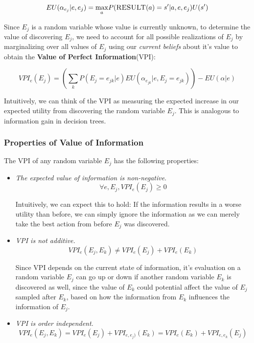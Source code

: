 \documentclass[11pt]{article}
\begin{document}
$$
EU(\alpha_{e_j} | e, e_j) = \underset{a}{\max} P(\textsc{RESULT}(a)=s'|a, e, e_j) U(s')
$$

Since $E_j$ is a random variable whose value is currently unknown, to determine the value of discovering $E_j$, we need to account for all possible realizations of $E_j$ by marginalizing over all values of $E_j$ using our \textit{current beliefs} about it's value to obtain the \textbf{Value of Perfect Information}(VPI):

$$
VPI_e(E_j) = \left( \sum_k P(E_j = e_{jk} | e) EU(\alpha_{e_{jk}} | e, E_j = e_{jk}) \right) - EU(\alpha | e)
$$

Intuitively, we can think of the VPI as measuring the expected increase in our expected utility from discovering the random variable $E_j$. This is analogous to information gain in decision trees.

\subsubsection{Properties of Value of Information}

The VPI of any random variable $E_j$ has the following properties:

\begin{itemize}
    \item \textit{The expected value of information is non-negative}.
    $$
    \forall e, E_j, VPI_e(E_j) \geq 0
    $$
    
    Intuitively, we can expect this to hold: If the information results in a worse utility than before, we can simply ignore the information as we can merely take the best action from before $E_j$ was discovered.
    
    \item \textit{VPI is not additive.}
    $$
    VPI_e(E_j, E_k) \neq VPI_e(E_j) + VPI_e(E_k)
    $$
    
    Since VPI depends on the current state of information, it's evaluation on a random variable $E_j$ can go up or down if another random variable $E_k$ is discovered as well, since the value of $E_k$ could potential affect the value of $E_j$ sampled after $E_k$, based on how the information from $E_k$ influences the information of $E_j$.
    
    \item \textit{VPI is order independent.}
    $$
    VPI_e(E_j, E_k) = VPI_e(E_j) + VPI_{e, e_j)}(E_k) = VPI_e(E_k) + VPI_{e, e_k}(E_j)
    $$
\end{itemize}
\end{document}
